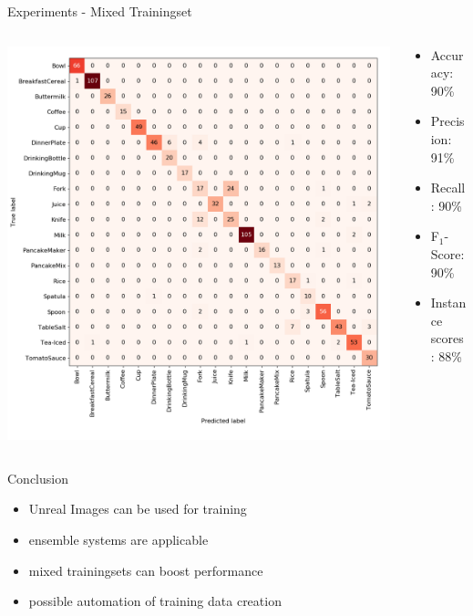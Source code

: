 \documentclass[]{beamer}
\begin{document}
\begin{frame}{Experiments - Mixed Trainingset}
\begin{columns}
	\begin{column}{0.7\textwidth}
		\includegraphics[scale=.3]{../thesis/img/chapter6/UnrealRealMixedGTClass.png}
	\end{column}
	\quad
	\begin{column}{0.3\textwidth}
		\begin{itemize}
			\item Accuracy: 90\%
			\item Precision: 91\%
			\item Recall: 90\%
			\item F$_{1}$-Score: 90\%
			\bigskip
			\item Instance scores: 88\%
		\end{itemize}
	\end{column}
\end{columns}
\end{frame}

\begin{frame}{Conclusion}
	\begin{itemize}
		\item Unreal Images can be used for training
		\item ensemble systems are applicable 
		\item mixed trainingsets can boost performance
		\bigskip
		\item possible automation of training data creation
	\end{itemize}
\end{frame}
\end{document}
